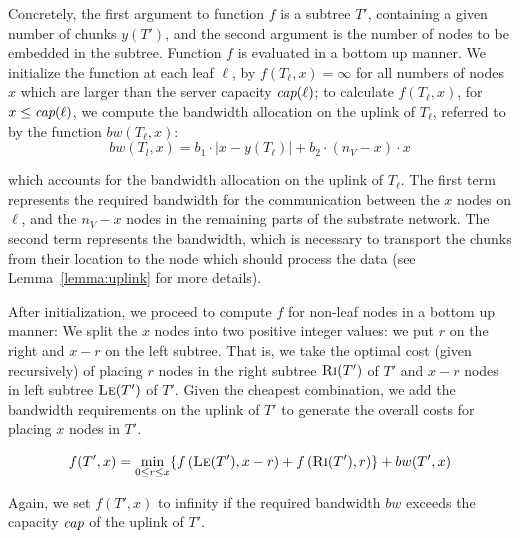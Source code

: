 \documentclass[9pt]{sigcomm-alternate}
\newcommand{\ChunkCount}{\ensuremath{y}}
\newcommand{\capacity}{\emph{cap}}
\newcommand{\Tree}{\ensuremath{T}}
\newcommand{\CostTrans}{\ensuremath{b_1}}
\newcommand{\CostCom}{\ensuremath{b_2}}
\newcommand{\Vms}{\ensuremath{n_V}}
\begin{document}
Concretely, the first argument to function $f$
is a subtree $\Tree'$, containing a given number of
chunks $\ChunkCount(\Tree')$,
and the
second argument is the number of nodes to be embedded in the subtree.
Function $f$ is evaluated in a bottom up manner. We initialize the
function at each leaf $\ell$, by $f(T_{\ell},x) =
\infty$ for all numbers of nodes $x$ which are larger than
the server capacity $\capacity(\ell)$;
to calculate $f(T_{\ell}, x)$, for $x \leq \capacity(\ell)$, we compute the
bandwidth allocation on the uplink of $T_{\ell}$, referred to by the function
$bw(T_{\ell},x)$:
$$bw(T_l,x)=  \CostTrans \cdot |x - \ChunkCount(T_{\ell})| + \CostCom \cdot
(\Vms - x) \cdot x$$

\noindent which accounts for the bandwidth allocation on the uplink of $T_{\ell}$. The
first
term represents the required bandwidth for the communication between the $x$
nodes on $\ell$, and the $\Vms - x$ nodes in the remaining parts of the substrate
network.
The second term represents
the bandwidth, which is necessary to transport the chunks from their location to
the node which should process the data (see Lemma~\ref{lemma:uplink} for more
details).

After initialization, we proceed to compute $f$ for non-leaf
nodes in a bottom up manner: We split the $x$ nodes
into two positive integer
values: we put $r$ on the right and $x - r$ on the left subtree.
That is, we take the optimal cost
(given recursively) of placing $r$ nodes in
the right subtree $\textsc{Ri}(T')$ of $T'$ and $x-r$ nodes in left subtree $\textsc{Le}(T')$ of
$T'$. Given the cheapest combination, we add the bandwidth requirements
on the uplink of $T'$ to generate the overall costs for placing $x$ nodes in $T'$.



$$f(T',x) =   \min_{0\leq r \leq x} \{  f\left(\textsc{Le}(T'),
x-r\right) +
f\left(\textsc{Ri}(T'), r\right) \} + bw(T',x)$$

Again, we set $f(T',x)$ to infinity if the required bandwidth
$bw$ exceeds the capacity $\capacity$ of the uplink of $T'$.
\end{document}
